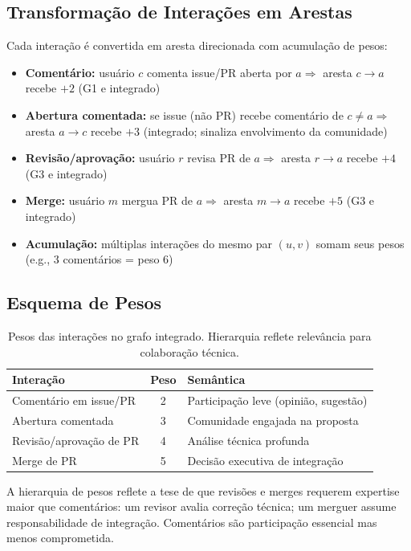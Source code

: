 \documentclass[12pt]{article}
\begin{document}
\subsection{Transformação de Interações em Arestas}

Cada interação é convertida em aresta direcionada com acumulação de pesos:
\begin{itemize}
  \item \textbf{Comentário:} usuário $c$ comenta issue/PR aberta por $a \Rightarrow$ aresta $c \to a$ recebe $+2$ (G1 e integrado)
  \item \textbf{Abertura comentada:} se issue (não PR) recebe comentário de $c \neq a \Rightarrow$ aresta $a \to c$ recebe $+3$ (integrado; sinaliza envolvimento da comunidade)
  \item \textbf{Revisão/aprovação:} usuário $r$ revisa PR de $a \Rightarrow$ aresta $r \to a$ recebe $+4$ (G3 e integrado)
  \item \textbf{Merge:} usuário $m$ mergua PR de $a \Rightarrow$ aresta $m \to a$ recebe $+5$ (G3 e integrado)
  \item \textbf{Acumulação:} múltiplas interações do mesmo par $(u, v)$ somam seus pesos (e.g., 3 comentários = peso 6)
\end{itemize}

\subsection{Esquema de Pesos}

\begin{table}[H]
  \centering
  \caption{Pesos das interações no grafo integrado. Hierarquia reflete relevância para colaboração técnica.}
  \label{tab:pesos}
  \begin{tabular}{l|c|p{5.5cm}}
    \toprule
    \textbf{Interação} & \textbf{Peso} & \textbf{Semântica} \\
    \midrule
    Comentário em issue/PR & 2 & Participação leve (opinião, sugestão) \\
    Abertura comentada & 3 & Comunidade engajada na proposta \\
    Revisão/aprovação de PR & 4 & Análise técnica profunda \\
    Merge de PR & 5 & Decisão executiva de integração \\
    \bottomrule
  \end{tabular}
\end{table}

A hierarquia de pesos reflete a tese de que revisões e merges requerem expertise maior que comentários: um revisor avalia correção técnica; um merguer assume responsabilidade de integração. Comentários são participação essencial mas menos comprometida.
\end{document}
